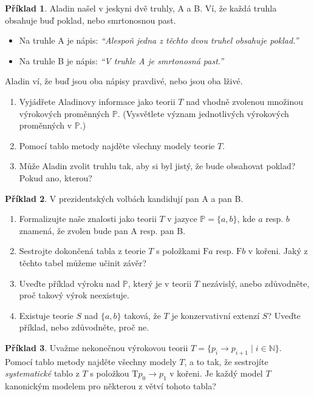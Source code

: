\documentclass[a4paper]{article}
\theoremstyle{definition}
\newtheorem{problem}{Příklad}
\begin{document}
\medskip\begin{problem}
Aladin našel v jeskyni dvě truhly, A a B. Ví, že každá truhla obsahuje buď poklad, nebo smrtonosnou past.
\begin{itemize}
\item Na truhle A je nápis: {\it ``Alespoň jedna z těchto dvou truhel obsahuje poklad.''}
\item Na truhle B je nápis: {\it ``V truhle A je smrtonosná past.''}
\end{itemize}
Aladin ví, že buď jsou oba nápisy pravdivé, nebo jsou oba lživé.
\begin{enumerate}
    \item Vyjádřete Aladinovy informace jako teorii $T$ nad vhodně zvolenou množinou výrokových proměnných $\mathbb P$. (Vysvětlete význam jednotlivých výrokových proměnných v $\mathbb P$.)
    \item Pomocí tablo metody najděte všechny modely teorie $T$.
    \item Může Aladin zvolit truhlu tak, aby si byl jistý, že bude obsahovat poklad? Pokud ano, kterou?
\end{enumerate}
\end{problem}


\medskip\begin{problem}
V prezidentských volbách kandidují pan A a pan B.
\begin{itemize}
\item Pan A říká: {\it ``Budu zvolen nebo pan B lže.''}
\item {Pan B říká: {\it ``Pan A nebude zvolen nebo lžu.''}
\end{itemize}
\begin{enumerate}
\item Formalizujte naše znalosti jako teorii $T$ v jazyce $\mathbb P=\{a,b\}$, kde $a$ resp. $b$ znamená, že zvolen bude pan A resp. pan B.
\item Sestrojte dokončená tabla z teorie $T$ s položkami $\mathrm{F}a$ resp. $\mathrm{F}b$ v kořeni. Jaký z těchto tabel můžeme učinit závěr?
\item Uveďte příklad výroku nad $\mathbb{P}$, který je v teorii $T$ nezávislý, anebo zdůvodněte, proč takový výrok neexistuje.
\item Existuje teorie $S$ nad $\{a,b\}$ taková, že $T$ je konzervativní extenzí $S$? Uveďte příklad, nebo zdůvodněte, proč ne.
\end{enumerate}
\end{problem}


\medskip\begin{problem}
    Uvažme nekonečnou výrokovou teorii $T=\{p_i \to p_{i+1}\mid i\in \mathbb{N}\}$. Pomocí tablo metody najděte všechny modely $T$, a to tak, že sestrojíte \emph{systematické} tablo z $T$ s položkou $\mathrm{T}p_0\to p_1$ v kořeni. Je každý model $T$ kanonickým modelem pro některou z větví tohoto tabla?
\end{problem}
\end{document}
